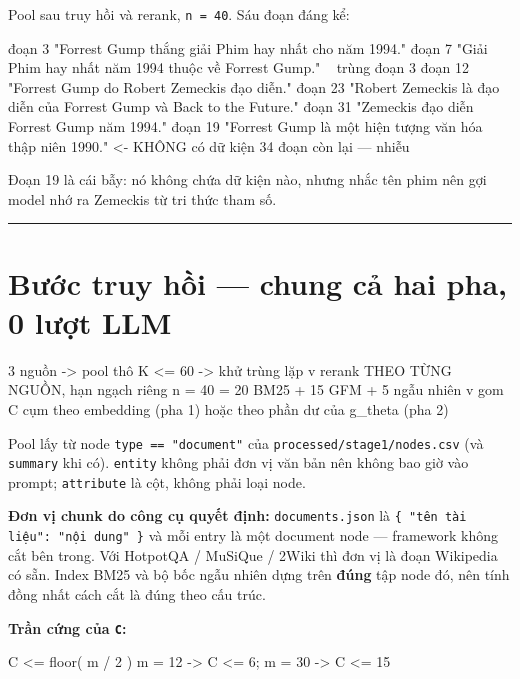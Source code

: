 \documentclass[11pt,a4paper]{article}
\begin{document}
Pool sau truy hồi và rerank, \texttt{n = 40}. Sáu đoạn đáng kể:

\begin{dia}
đoạn  3   "Forrest Gump thắng giải Phim hay nhất cho năm 1994."
đoạn  7   "Giải Phim hay nhất năm 1994 thuộc về Forrest Gump."        ~ trùng đoạn 3
đoạn 12   "Forrest Gump do Robert Zemeckis đạo diễn."
đoạn 23   "Robert Zemeckis là đạo diễn của Forrest Gump và Back to the Future."
đoạn 31   "Zemeckis đạo diễn Forrest Gump năm 1994."
đoạn 19   "Forrest Gump là một hiện tượng văn hóa thập niên 1990."    <- KHÔNG có dữ kiện
34 đoạn còn lại — nhiễu
\end{dia}

Đoạn 19 là cái bẫy: nó không chứa dữ kiện nào, nhưng nhắc tên phim nên gợi model nhớ ra
Zemeckis từ tri thức tham số.

\vspace{0.3em}\hrule\vspace{0.6em}

\section{Bước truy hồi — chung cả hai pha, 0 lượt LLM}

\begin{dia}
3 nguồn  ->  pool thô  K <= 60  ->  khử trùng lặp
                 v  rerank THEO TỪNG NGUỒN, hạn ngạch riêng
n = 40   =   20 BM25   +   15 GFM   +   5 ngẫu nhiên
                 v
gom C cụm theo embedding (pha 1) hoặc theo phần dư của g_theta (pha 2)
\end{dia}

Pool lấy từ node \texttt{type == "document"} của \texttt{processed/stage1/nodes.csv} (và \texttt{summary} khi có).
\texttt{entity} không phải đơn vị văn bản nên không bao giờ vào prompt; \texttt{attribute} là cột, không phải
loại node.

\textbf{Đơn vị chunk do công cụ quyết định:} \texttt{documents.json} là \texttt{\{ "tên tài liệu": "nội dung" \}} và
mỗi entry là một document node — framework không cắt bên trong. Với HotpotQA / MuSiQue / 2Wiki
thì đơn vị là đoạn Wikipedia có sẵn. Index BM25 và bộ bốc ngẫu nhiên dựng trên \textbf{đúng} tập
node đó, nên tính đồng nhất cách cắt là đúng theo cấu trúc.

\textbf{Trần cứng của \texttt{C}:}

\begin{dia}
C  <=  floor( m / 2 )              m = 12 -> C <= 6;   m = 30 -> C <= 15
\end{dia}
\end{document}
